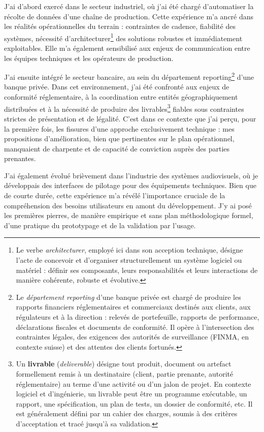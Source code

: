 J'ai d'abord exercé dans le secteur industriel, où j'ai été chargé d'automatiser la récolte de données d'une chaîne de production. Cette expérience m'a ancré dans les réalités opérationnelles du terrain : contraintes de cadence, fiabilité des systèmes, nécessité d'architecturer\footnote{Le verbe \emph{architecturer}, employé ici dans son acception technique, désigne l'acte de concevoir et d'organiser structurellement un système logiciel ou matériel : définir ses composants, leurs responsabilités et leurs interactions de manière cohérente, robuste et évolutive.} des solutions robustes et immédiatement exploitables. Elle m'a également sensibilisé aux enjeux de communication entre les équipes techniques et les opérateurs de production.

J'ai ensuite intégré le secteur bancaire, au sein du département reporting\footnote{Le \emph{département reporting} d'une banque privée est chargé de produire les rapports financiers réglementaires et commerciaux destinés aux clients, aux régulateurs et à la direction : relevés de portefeuille, rapports de performance, déclarations fiscales et documents de conformité. Il opère à l'intersection des contraintes légales, des exigences des autorités de surveillance (FINMA, en contexte suisse) et des attentes des clients fortunés.\label{fn:reporting}} d'une banque privée. Dans cet environnement, j'ai été confronté aux enjeux de conformité réglementaire, à la coordination entre entités géographiquement distribuées et à la nécessité de produire des livrables\footnote{Un \textbf{livrable} (\emph{deliverable}) désigne tout produit, document ou artefact formellement remis à un destinataire (client, partie prenante, autorité réglementaire) au terme d'une activité ou d'un jalon de projet. En contexte logiciel et d'ingénierie, un livrable peut être un programme exécutable, un rapport, une spécification, un plan de tests, un dossier de conformité, etc. Il est généralement défini par un cahier des charges, soumis à des critères d'acceptation et tracé jusqu'à sa validation.\label{fn:livrable}} fiables sous contraintes strictes de présentation et de légalité. C'est dans ce contexte que j'ai perçu, pour la première fois, les fissures d'une approche exclusivement technique : mes propositions d'amélioration, bien que pertinentes sur le plan opérationnel, manquaient de charpente et de capacité de conviction auprès des parties prenantes.

J'ai également évolué brièvement dans l'industrie des systèmes audiovisuels, où je développais des interfaces de pilotage pour des équipements techniques. Bien que de courte durée, cette expérience m'a révélé l'importance cruciale de la compréhension des besoins utilisateurs en amont du développement. J'y ai posé les premières pierres, de manière empirique et sans plan méthodologique formel, d'une pratique du prototypage et de la validation par l'usage.

